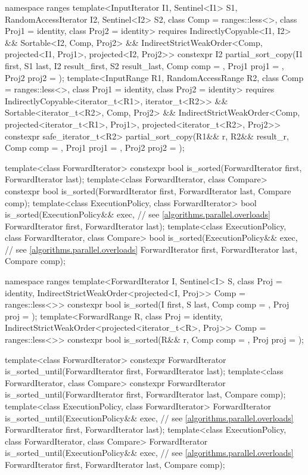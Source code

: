 \begin{codeblock}
{  namespace ranges {
    template<InputIterator I1, Sentinel<I1> S1, RandomAccessIterator I2, Sentinel<I2> S2,
             class Comp = ranges::less<>, class Proj1 = identity, class Proj2 = identity>
      requires IndirectlyCopyable<I1, I2> && Sortable<I2, Comp, Proj2> &&
               IndirectStrictWeakOrder<Comp, projected<I1, Proj1>, projected<I2, Proj2>>
      constexpr I2
        partial_sort_copy(I1 first, S1 last, I2 result_first, S2 result_last,
                          Comp comp = {}, Proj1 proj1 = {}, Proj2 proj2 = {});
    template<InputRange R1, RandomAccessRange R2, class Comp = ranges::less<>,
             class Proj1 = identity, class Proj2 = identity>
      requires IndirectlyCopyable<iterator_t<R1>, iterator_t<R2>> &&
               Sortable<iterator_t<R2>, Comp, Proj2> &&
               IndirectStrictWeakOrder<Comp, projected<iterator_t<R1>, Proj1>,
                                       projected<iterator_t<R2>, Proj2>>
      constexpr safe_iterator_t<R2>
        partial_sort_copy(R1&& r, R2&& result_r, Comp comp = {},
                          Proj1 proj1 = {}, Proj2 proj2 = {});
  }

  template<class ForwardIterator>
    constexpr bool is_sorted(ForwardIterator first, ForwardIterator last);
  template<class ForwardIterator, class Compare>
    constexpr bool is_sorted(ForwardIterator first, ForwardIterator last,
                             Compare comp);
  template<class ExecutionPolicy, class ForwardIterator>
    bool is_sorted(ExecutionPolicy&& exec, // see \ref{algorithms.parallel.overloads}
                   ForwardIterator first, ForwardIterator last);
  template<class ExecutionPolicy, class ForwardIterator, class Compare>
    bool is_sorted(ExecutionPolicy&& exec, // see \ref{algorithms.parallel.overloads}
                   ForwardIterator first, ForwardIterator last,
                   Compare comp);

  namespace ranges {
    template<ForwardIterator I, Sentinel<I> S, class Proj = identity,
             IndirectStrictWeakOrder<projected<I, Proj>> Comp = ranges::less<>>
      constexpr bool is_sorted(I first, S last, Comp comp = {}, Proj proj = {});
    template<ForwardRange R, class Proj = identity,
             IndirectStrictWeakOrder<projected<iterator_t<R>, Proj>> Comp = ranges::less<>>
      constexpr bool is_sorted(R&& r, Comp comp = {}, Proj proj = {});
  }

  template<class ForwardIterator>
    constexpr ForwardIterator
      is_sorted_until(ForwardIterator first, ForwardIterator last);
  template<class ForwardIterator, class Compare>
    constexpr ForwardIterator
      is_sorted_until(ForwardIterator first, ForwardIterator last,
                      Compare comp);
  template<class ExecutionPolicy, class ForwardIterator>
    ForwardIterator
      is_sorted_until(ExecutionPolicy&& exec, // see \ref{algorithms.parallel.overloads}
                      ForwardIterator first, ForwardIterator last);
  template<class ExecutionPolicy, class ForwardIterator, class Compare>
    ForwardIterator
      is_sorted_until(ExecutionPolicy&& exec, // see \ref{algorithms.parallel.overloads}
                      ForwardIterator first, ForwardIterator last,
                      Compare comp);

}
\end{codeblock}
